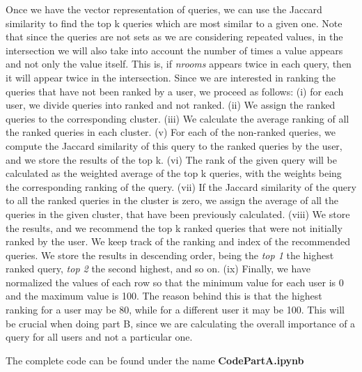 \documentclass[sigconf]{acmart}
\begin{document}
Once we have the vector representation of queries, we can use the Jaccard similarity to find the top k queries which are most similar to a given one. Note that since the queries are not sets as we are considering repeated values, in the intersection we will also take into account the number of times a value appears and not only the value itself. This is, if \textit{nrooms} appears twice in each query, then it will appear twice in the intersection. Since we are interested in ranking the queries that have not been ranked by a user, we proceed as follows: (i) for each user, we divide queries into ranked and not ranked. (ii) We assign the ranked queries to the corresponding cluster. (iii) We calculate the average ranking of all the ranked queries in each cluster. (v) For each of the non-ranked queries, we compute the Jaccard similarity of this query to the ranked queries by the user, and we store the results of the top k. (vi) The rank of the given query will be calculated as the weighted average of the top k queries, with the weights being the corresponding ranking of the query. (vii) If the Jaccard similarity of the query to all the ranked queries in the cluster is zero, we assign the average of all the queries in the given cluster, that have been previously calculated. (viii) We store the results, and we recommend the top k ranked queries that were not initially ranked by the user. We keep track of the ranking and index of the recommended queries. We store the results in descending order, being the \textit{top 1} the highest ranked query, \textit{top 2} the second highest, and so on. (ix) Finally, we have normalized the values of each row so that the minimum value for each user is 0 and the maximum value is 100. The reason behind this is that the highest ranking for a user may be 80, while for a different user it may be 100. This will be crucial when doing part B, since we are calculating the overall importance of a query for all users and not a particular one. 

\begin{algorithm}
\end{algorithm}
The complete code can be found under the name \textbf{CodePartA.ipynb}
\end{document}
